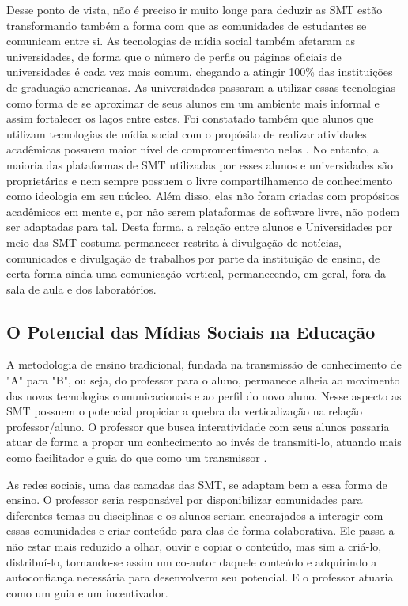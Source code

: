 
Desse ponto de vista, não é preciso ir muito longe para deduzir as SMT estão
transformando também a forma com que as comunidades de estudantes se comunicam
entre si. As tecnologias de mídia social também afetaram as universidades, de
forma que o número de perfis ou páginas oficiais de universidades é cada vez mais
comum, chegando a atingir 100\% das instituições de graduação americanas.
%
As universidades passaram a utilizar essas tecnologias como forma de se aproximar
de seus alunos em um ambiente mais informal e assim fortalecer os laços entre
estes. Foi constatado também que alunos que utilizam tecnologias de mídia
social com o propósito de realizar atividades acadêmicas possuem maior nível de
compromentimento nelas \cite{ccsse2009}.
%
No entanto, a maioria das plataformas de SMT utilizadas por esses alunos e
universidades são proprietárias e nem sempre possuem o livre compartilhamento de
conhecimento como ideologia em seu núcleo. Além disso, elas não foram criadas com
propósitos acadêmicos em mente e, por não serem plataformas de software livre,
não podem ser adaptadas para tal.
%
Desta forma, a relação entre alunos e Universidades por meio das SMT costuma
permanecer restrita à divulgação de notícias, comunicados e divulgação de
trabalhos por parte da instituição de ensino, de certa forma ainda uma
comunicação vertical, permanecendo, em geral, fora da sala de aula e dos
laboratórios.

\subsection{O Potencial das Mídias Sociais na Educação}

A metodologia de ensino tradicional, fundada na transmissão de conhecimento de
"A" para "B", ou seja, do professor para o aluno, permanece alheia ao movimento
das novas tecnologias comunicacionais e ao perfil do novo aluno. Nesse aspecto
as SMT possuem o potencial propiciar a quebra da verticalização na relação
professor/aluno. O professor que busca interatividade com seus alunos passaria
atuar de forma a propor um conhecimento ao invés de transmiti-lo,  atuando mais
como facilitador e guia do que como um transmissor \cite{silva2002}.

As redes sociais, uma das camadas das SMT, se adaptam bem a essa forma de
ensino. O professor seria responsável por disponibilizar comunidades para
diferentes temas ou disciplinas e os alunos seriam encorajados a interagir com
essas comunidades e criar conteúdo para elas de forma colaborativa. Ele passa
a não estar mais reduzido a olhar, ouvir e copiar o conteúdo, mas sim a criá-lo,
distribuí-lo, tornando-se assim um co-autor daquele conteúdo e adquirindo a
autoconfiança necessária para desenvolverm seu potencial. E o professor
atuaria como um guia e um incentivador.

